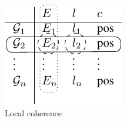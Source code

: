 
\begin{figure}[h]
\centering
\includegraphics{CoherenceTable-crop.pdf}
\caption{Local coherence\label{fig:LocalCoherence}}
\end{figure}


